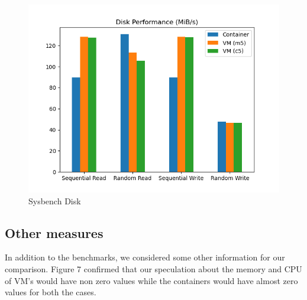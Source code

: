 \documentclass[11pt]{article}
\begin{document}
\begin{figure}[H]
\centering
  \includegraphics[width=0.55\linewidth]{sysbench_disk.png}
  \caption{Sysbench Disk}
  \label{fig:disk}
\end{figure}


\subsection{Other measures}

\vspace{5mm} %

In addition to the benchmarks, we considered some other information for our comparison. Figure 7 confirmed that our speculation about the memory and CPU of VM's would have non zero values while the containers would have almost zero values for both the cases. 
\end{document}
